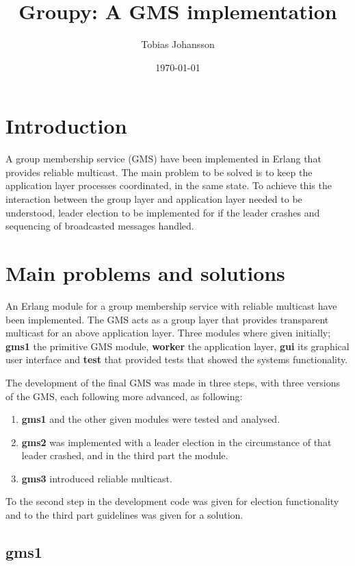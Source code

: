 \documentclass[a4paper, 11pt]{article}
\title{Groupy: A GMS implementation}
\author{Tobias Johansson}
\date{\today{}}
\begin{document}
\maketitle

\section{Introduction}

A group membership service (GMS) have been implemented in Erlang that provides reliable multicast. The main problem to be solved is to keep the application layer processes coordinated, in the same state. To achieve this the interaction between the group layer and application layer needed to be understood, leader election to be implemented for if the leader crashes and sequencing of broadcasted messages handled.

\section{Main problems and solutions}

An Erlang module for a group membership service with reliable multicast have been implemented. The GMS acts as a group layer that provides transparent multicast for an above application layer. Three modules where given initially; \textbf{gms1} the primitive GMS module, \textbf{worker} the application layer, \textbf{gui} its graphical user interface and \textbf{test} that provided tests that showed the systems functionality.

The development of the final GMS was made in three steps, with three versions of the GMS, each following more advanced, as following:

\begin{enumerate}
  \item \textbf{gms1} and the other given modules were tested and analysed.
  \item \textbf{gms2} was implemented with a leader election in the circumstance of that leader crashed, and in the third part the module.
  \item \textbf{gms3} introduced reliable multicast.
\end{enumerate}

To the second step in the development code was given for election functionality and to the third part guidelines was given for a solution.

\subsection{gms1}
\end{document}
